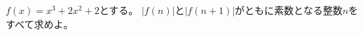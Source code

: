 \documentclass[../../main.tex]{subfiles}
\begin{document}
$f(x)=x^3+2x^2+2$とする。
$|f(n)|$と$|f(n+1)|$がともに素数となる整数$n$をすべて求めよ。
\end{document}
